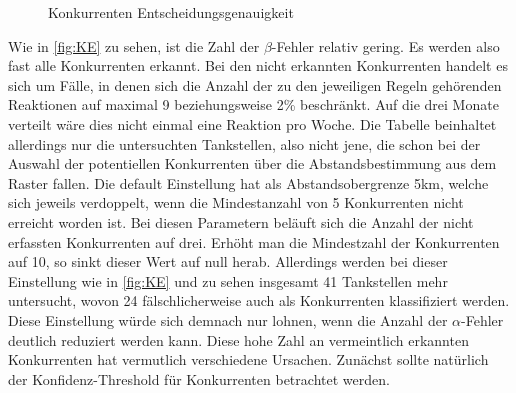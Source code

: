 \begin{figure}[!ht]
	\caption{Konkurrenten Entscheidungsgenauigkeit}
	\hspace*{\fill}%
		\hfill
		\hfill
	\hspace*{\fill}%
	\label{fig:KE}
\end{figure}

Wie in \autoref{fig:KE} zu sehen, ist die Zahl der $\beta$-Fehler relativ gering. Es werden also fast alle Konkurrenten erkannt. Bei den nicht erkannten Konkurrenten handelt es sich um Fälle, in denen sich die Anzahl der zu den jeweiligen Regeln gehörenden Reaktionen auf maximal 9 beziehungsweise 2\% beschränkt. Auf die drei Monate verteilt wäre dies nicht einmal eine Reaktion pro Woche. Die Tabelle beinhaltet allerdings nur die untersuchten Tankstellen, also nicht jene, die schon bei der Auswahl der potentiellen Konkurrenten über die Abstandsbestimmung aus dem Raster fallen. Die default Einstellung hat als Abstandsobergrenze 5km, welche sich jeweils verdoppelt, wenn die Mindestanzahl von 5 Konkurrenten nicht erreicht worden ist. Bei diesen Parametern beläuft sich die Anzahl der nicht erfassten Konkurrenten auf drei. Erhöht man die Mindestzahl der Konkurrenten auf 10, so sinkt dieser Wert auf null herab. Allerdings werden bei dieser Einstellung wie in \autoref{fig:KE} und  zu sehen insgesamt 41 Tankstellen mehr untersucht, wovon 24 fälschlicherweise auch als Konkurrenten klassifiziert werden. Diese Einstellung würde sich demnach nur lohnen, wenn die Anzahl der $\alpha$-Fehler deutlich reduziert werden kann. Diese hohe Zahl an vermeintlich erkannten Konkurrenten hat vermutlich verschiedene Ursachen. Zunächst sollte natürlich der Konfidenz-Threshold für Konkurrenten betrachtet werden.

